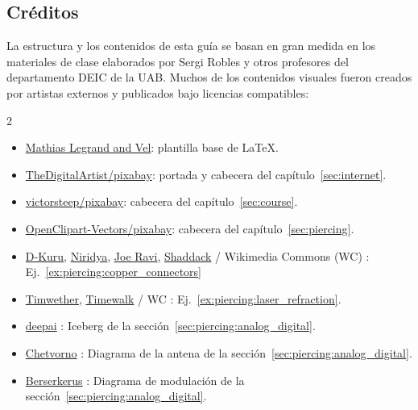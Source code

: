 \subsection*{Créditos}

\noindent
La estructura y los contenidos de esta guía se basan en gran medida en los materiales de clase elaborados por
Sergi Robles y otros profesores del departamento DEIC de la UAB.
Muchos de los contenidos visuales fueron creados por artistas externos y publicados bajo licencias compatibles:
\begin{multicols}{2}
\small
\begin{itemize}
\item \href{https://www.overleaf.com/latex/templates/the-legrand-orange-book-template-english/jtctyfmnpppc}{Mathias Legrand and Vel}: plantilla base de \LaTeX{}.
\item \href{https://pixabay.com/users/thedigitalartist-202249/}{TheDigitalArtist/pixabay}: portada y cabecera del capítulo~\ref{sec:internet}.
\item \href{https://pixabay.com/users/victorsteep-9526460/}{victorsteep/pixabay}: cabecera del capítulo~\ref{sec:course}.
\item \href{https://pixabay.com/users/openclipart-vectors-30363/}{OpenClipart-Vectors/pixabay}: cabecera del capítulo~\ref{sec:piercing}.
\item 
\href{https://en.wikipedia.org/wiki/File:HDMI_connector-male_2_sharp_PNr\%C2\%B00059.jpg}{D-Kuru},
\href{https://commons.wikimedia.org/wiki/File:USB_Type-C_icon.svg}{Niridya},
\href{https://commons.wikimedia.org/wiki/File:N_Connector.jpg}{Joe Ravi},
\href{https://en.wikipedia.org/wiki/File:Photo-RJ11-MF.jpg}{Shaddack}
/ Wikimedia Commons (WC) : Ej.~\ref{ex:piercing:copper_connectors}
\item \href{https://en.wikipedia.org/wiki/File:Laser_in_fibre.jpg}{Timwether}, \href{https://commons.wikimedia.org/wiki/File:MMF_optical.jpg}{Timewalk} / WC : Ej.~\ref{ex:piercing:laser_refraction}.
\item \href{https://deepai.org/machine-learning-model/text2img}{deepai} : Iceberg de la sección~\ref{sec:piercing:analog_digital}.
\item \href{https://commons.wikimedia.org/wiki/File:Dipole_receiving_antenna_animation_6_300ms.gif}{Chetvorno} : Diagrama de la antena de la sección~\ref{sec:piercing:analog_digital}.
\item \href{https://commons.wikimedia.org/wiki/File:Amfm3-en-de.gif}{Berserkerus} : Diagrama de modulación de la sección~\ref{sec:piercing:analog_digital}.

\end{itemize}
\end{multicols}
